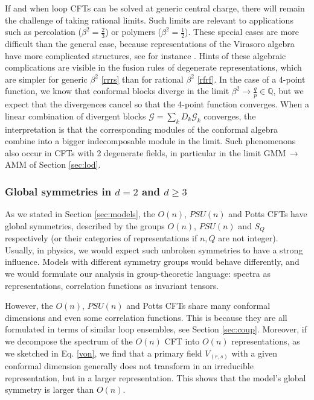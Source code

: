 \documentclass[12pt, a4paper]{article}
\begin{document}
If and when loop CFTs can be solved at generic central charge, there will remain the challenge of taking rational limits. Such limits are relevant to applications such as percolation ($\beta^2=\frac23$) or polymers ($\beta^2=\frac12$). These special cases are more difficult than the general case, because representations of the Virasoro algebra have more complicated structures, see for instance \cite{hs21}. Hints of these algebraic complications are visible in the fusion rules of degenerate representations, which are simpler for generic $\beta^2$ \eqref{rrrs} than for rational $\beta^2$ \eqref{rfrf}. In the case of a 4-point function, we know that conformal blocks diverge in the limit $\beta^2\to \frac{q}{p}\in\mathbb{Q}$, but we expect that the divergences cancel so that the 4-point function converges. When a linear combination of divergent blocks $\mathcal{G} = \sum_k D_k \mathcal{G}_k$ converges, the interpretation is that the corresponding modules of the conformal algebra combine into a bigger indecomposable module in the limit. Such phenomenons also occur in CFTs with 2 degenerate fields, in particular in the limit GMM\,$\to$\,AMM of Section \ref{sec:lod}.

\subsubsection{Global symmetries in $d=2$ and $d\geq 3$}

As we stated in Section \ref{sec:models}, the $O(n)$, $PSU(n)$ and Potts CFTs have global symmetries, described by the groups $O(n)$, $PSU(n)$ and $S_Q$ respectively (or their categories of representations if $n,Q$ are not integer). Usually, in physics, we would expect such unbroken symmetries to have a strong influence. Models with different symmetry groups would behave differently, and we would formulate our analysis in group-theoretic language: spectra as representations, correlation functions as invariant tensors.

However, the $O(n)$, $PSU(n)$ and Potts CFTs share many conformal dimensions and even some correlation functions.
This is because they are all formulated in terms of similar loop ensembles, see Section \ref{sec:coup}.
Moreover, if we decompose the spectrum of the $O(n)$ CFT into $O(n)$ representations, as we sketched in Eq. \eqref{von}, we find that a primary field $V_{(r,s)}$ with a given conformal dimension generally does not transform in an irreducible representation, but in a larger representation. This shows that the model's global symmetry is larger than $O(n)$. 
\end{document}
